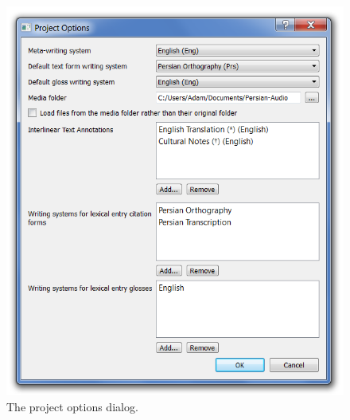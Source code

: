 \documentclass[oneside]{book}
\begin{document}
\begin{figure}
\includegraphics[width=\textwidth]{project-options.png}
\caption{The project options dialog.}\label{fig:po}
\end{figure}
\end{document}
